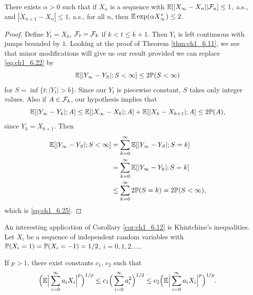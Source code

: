
\begin{corollary}\label{cor:ch1_6.12}
There exists $\alpha > 0$ such that if $X_n$ is a sequence with $\E[|X_\infty - X_n|\mid \FC_n] \leq 1$, a.s., and $|X_{n+1} - X_n| \leq 1$, a.s., for all $n$, then $\E \exp(\alpha X_\infty^*) \leq 2$.
\end{corollary}

\begin{proof}
Define $Y_t = X_k$, $\FC_t=\FC_k$ if $k < t \leq k+1$. Then $Y_t$ is left continuous with jumps bounded by $1$. Looking at the proof of Theorem \ref{thm:ch1_6.11}, we see that minor modifications will give us our result provided we can replace \eqref{eq:ch1_6.22} by
\begin{equation}\label{eq:ch1_6.25}
    \E[|Y_\infty - Y_S|;S < \infty] \leq 2\P(S < \infty)
\end{equation}
for $S = \inf\{t : |Y_t| > b\}$. Since our $Y_t$ is piecewise constant, $S$ takes only integer values. Also if $A \in \FC_k$, our hypothesis implies that
\[
    \E[|Y_\infty - Y_k|;A] \leq \E[|X_\infty - X_k|;A] + \E[|X_k - X_{k+1}|;A] \leq 2\P(A),
\]
since $Y_k = X_{k+1}$. Then
\begin{align*}
    \E[|Y_\infty - Y_S|;S < \infty] &= \sum_{k=0}^{\infty} \E[|Y_\infty - Y_S|;S = k] \\
    &=\sum_{k=0}^{\infty} \E[|Y_\infty - Y_k|;S = k] \\
    &\leq \sum_{k=0}^{\infty} 2\P(S=k) = 2\P(S < \infty),
\end{align*}
which is \eqref{eq:ch1_6.25}.
\end{proof}

An interesting application of Corollary \ref{cor:ch1_6.12} is Khintchine's inequalities. Let $X_i$ be a sequence of independent random variables with $\P(X_i = 1) = \P(X_i = -1) = 1/2$, $i = 0,1,2,\ldots$.


\begin{theorem}\label{thm:ch1_6.13}
If $p > 1$, there exist constants $c_1$, $c_2$ such that
\[
    \Big(\E\Big|\sum_{i=0}^{\infty} a_iX_i\Big|^p\Big)^{1/p} \leq c_1\Big(\sum_{i=0}^{\infty} a_i^2\Big)^{1/2} \leq c_2\Big(\E\Big|\sum_{i=0}^{\infty} a_iX_i\Big|^p\Big)^{1/p}.
\]
\end{theorem}

